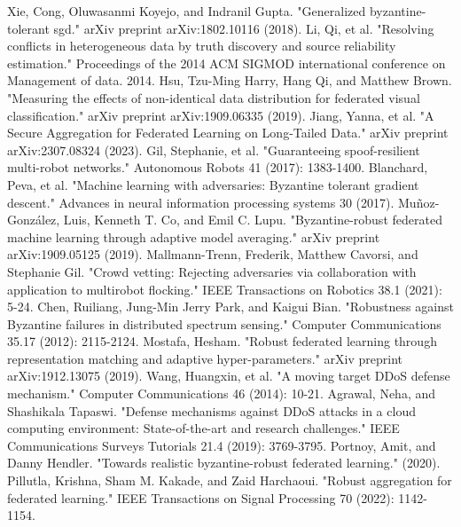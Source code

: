 \documentclass[conference]{IEEEtran}
\begin{document}
\begin{thebibliography}{00}
     Xie, Cong, Oluwasanmi Koyejo, and Indranil Gupta. "Generalized byzantine-tolerant sgd." arXiv preprint arXiv:1802.10116 (2018).
     Li, Qi, et al. "Resolving conflicts in heterogeneous data by truth discovery and source reliability estimation." Proceedings of the 2014 ACM SIGMOD international conference on Management of data. 2014.
     Hsu, Tzu-Ming Harry, Hang Qi, and Matthew Brown. "Measuring the effects of non-identical data distribution for federated visual classification." arXiv preprint arXiv:1909.06335 (2019).
     Jiang, Yanna, et al. "A Secure Aggregation for Federated Learning on Long-Tailed Data." arXiv preprint arXiv:2307.08324 (2023).
     Gil, Stephanie, et al. "Guaranteeing spoof-resilient multi-robot networks." Autonomous Robots 41 (2017): 1383-1400.
     Blanchard, Peva, et al. "Machine learning with adversaries: Byzantine tolerant gradient descent." Advances in neural information processing systems 30 (2017).
     Muñoz-González, Luis, Kenneth T. Co, and Emil C. Lupu. "Byzantine-robust federated machine learning through adaptive model averaging." arXiv preprint arXiv:1909.05125 (2019).
     Mallmann-Trenn, Frederik, Matthew Cavorsi, and Stephanie Gil. "Crowd vetting: Rejecting adversaries via collaboration with application to multirobot flocking." IEEE Transactions on Robotics 38.1 (2021): 5-24.
     Chen, Ruiliang, Jung-Min Jerry Park, and Kaigui Bian. "Robustness against Byzantine failures in distributed spectrum sensing." Computer Communications 35.17 (2012): 2115-2124.
     Mostafa, Hesham. "Robust federated learning through representation matching and adaptive hyper-parameters." arXiv preprint arXiv:1912.13075 (2019).
     Wang, Huangxin, et al. "A moving target DDoS defense mechanism." Computer Communications 46 (2014): 10-21.
     Agrawal, Neha, and Shashikala Tapaswi. "Defense mechanisms against DDoS attacks in a cloud computing environment: State-of-the-art and research challenges." IEEE Communications Surveys  Tutorials 21.4 (2019): 3769-3795.
     Portnoy, Amit, and Danny Hendler. "Towards realistic byzantine-robust federated learning." (2020).
     Pillutla, Krishna, Sham M. Kakade, and Zaid Harchaoui. "Robust aggregation for federated learning." IEEE Transactions on Signal Processing 70 (2022): 1142-1154.




\end{thebibliography}
\end{document}
